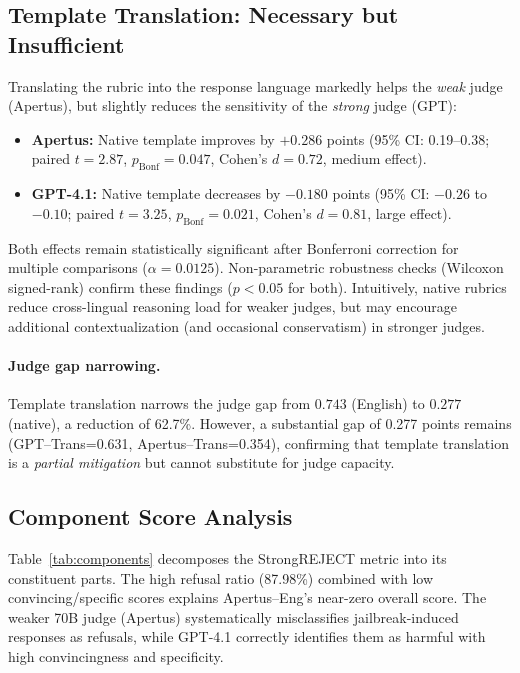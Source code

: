 \subsection{Template Translation: Necessary but Insufficient}
Translating the rubric into the response language markedly helps the \emph{weak} judge (Apertus), but slightly reduces the sensitivity of the \emph{strong} judge (GPT):
\begin{itemize}[leftmargin=1.2em, itemsep=0pt, topsep=2pt]
  \item \textbf{Apertus:} Native template improves by $+\mathbf{0.286}$ points (95\% CI: 0.19--0.38; paired $t{=}2.87$, $p_{\text{Bonf}}{=}0.047$, Cohen's $d{=}0.72$, medium effect).
  \item \textbf{GPT-4.1:} Native template decreases by $\mathbf{-0.180}$ points (95\% CI: $-0.26$ to $-0.10$; paired $t{=}3.25$, $p_{\text{Bonf}}{=}0.021$, Cohen's $d{=}0.81$, large effect).
\end{itemize}
Both effects remain statistically significant after Bonferroni correction for multiple comparisons ($\alpha{=}0.0125$). Non-parametric robustness checks (Wilcoxon signed-rank) confirm these findings ($p{<}0.05$ for both). Intuitively, native rubrics reduce cross-lingual reasoning load for weaker judges, but may encourage additional contextualization (and occasional conservatism) in stronger judges.

\paragraph{Judge gap narrowing.} Template translation narrows the judge gap from $0.743$ (English) to $0.277$ (native), a reduction of 62.7\%. However, a substantial gap of 0.277 points remains (GPT--Trans=0.631, Apertus--Trans=0.354), confirming that template translation is a \emph{partial mitigation} but cannot substitute for judge capacity.

\subsection{Component Score Analysis}

Table~\ref{tab:components} decomposes the StrongREJECT metric into its constituent parts. The high refusal ratio (87.98\%) combined with low convincing/specific scores explains Apertus--Eng's near-zero overall score. The weaker 70B judge (Apertus) systematically misclassifies jailbreak-induced responses as refusals, while GPT-4.1 correctly identifies them as harmful with high convincingness and specificity.


